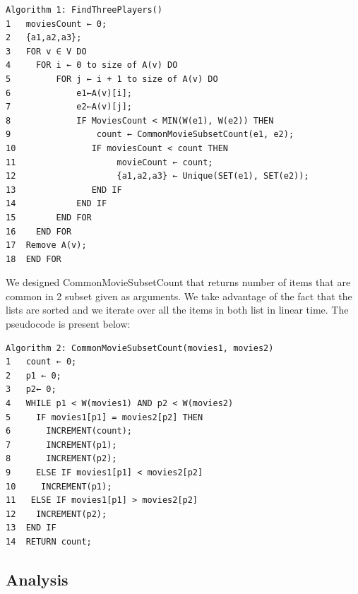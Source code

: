 \begin{verbatim}
Algorithm 1: FindThreePlayers()
1	moviesCount ← 0;
2	{a1,a2,a3};
3	FOR v ∈ V DO
4	  FOR i ← 0 to size of A(v) DO
5	      FOR j ← i + 1 to size of A(v) DO
6	          e1←A(v)[i];
7	          e2←A(v)[j];
8	          IF MoviesCount < MIN(W(e1), W(e2)) THEN
9	              count ← CommonMovieSubsetCount(e1, e2);
10	             IF moviesCount < count THEN
11	                  movieCount ← count;
12	                  {a1,a2,a3} ← Unique(SET(e1), SET(e2));
13	             END IF
14	          END IF
15	      END FOR
16	  END FOR
17	Remove A(v);
18	END FOR	  	                    	  
\end{verbatim}

We designed CommonMovieSubsetCount that returns number of items that are common in 2 subset given as arguments. We take advantage of the fact that the lists are sorted and we iterate over all the items in both list in linear time. The pseudocode is present below:

\begin{verbatim}
Algorithm 2: CommonMovieSubsetCount(movies1, movies2)
1	count ← 0;
2	p1 ← 0;
3	p2← 0;
4	WHILE p1 < W(movies1) AND p2 < W(movies2)
5	  IF movies1[p1] = movies2[p2] THEN
6	    INCREMENT(count);
7	    INCREMENT(p1);
8	    INCREMENT(p2);
9	  ELSE IF movies1[p1] < movies2[p2]
10	   INCREMENT(p1);
11	 ELSE IF movies1[p1] > movies2[p2]
12	  INCREMENT(p2);
13	END IF
14	RETURN count;
\end{verbatim}

\subsection{Analysis}